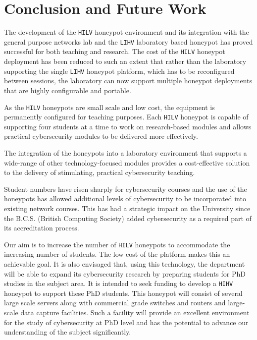 \documentclass{ieeeaccess}
\begin{document}
\section{Conclusion and Future Work}\label{sec:ConclusionFuture}

The development of the \texttt{HILV} honeypot environment and its integration with the general purpose networks lab and the \texttt{LIHV} laboratory based honeypot has proved successful
for both teaching and research. The cost of the \texttt{HILV} honeypot deployment has been reduced
to such an extent that rather than the laboratory supporting the single \texttt{LIHV} honeypot
platform, which has to be reconfigured between sessions, the laboratory can now
support multiple honeypot deployments that are highly configurable and
portable.

As the \texttt{HILV} honeypots are small scale and low cost, the equipment is
permanently configured for teaching purposes. Each \texttt{HILV} honeypot is
capable of supporting four students at a time to work on research-based modules
and allows practical cybersecurity modules to be delivered more effectively.

The integration of the honeypots into a laboratory environment that supports
a wide-range of other technology-focused modules provides a cost-effective
solution to the delivery of stimulating, practical cybersecurity teaching.

Student numbers have risen sharply for cybersecurity courses and the
use of the honeypots has allowed additional levels of cybersecurity to be
incorporated into existing network courses. This has had a strategic impact on
the University since the B.C.S. (British Computing Society) added
cybersecurity as a required part of its accreditation process.

Our aim is to increase the number of \texttt{HILV} honeypots to accommodate the
increasing number of students. The low cost of the platform makes this an
achievable goal. It is also envisaged that, using this technology, the
department will be able to expand its cybersecurity research by preparing
students for PhD studies in the subject area. It is intended to seek funding to
develop a \texttt{HIHV} honeypot to support these PhD students. This honeypot
will consist of several large scale servers along with commercial grade
switches and routers and large-scale data capture facilities. Such a facility
will provide an excellent environment for the study of cybersecurity at PhD
level and has the potential to advance our understanding of the subject
significantly.
\end{document}
